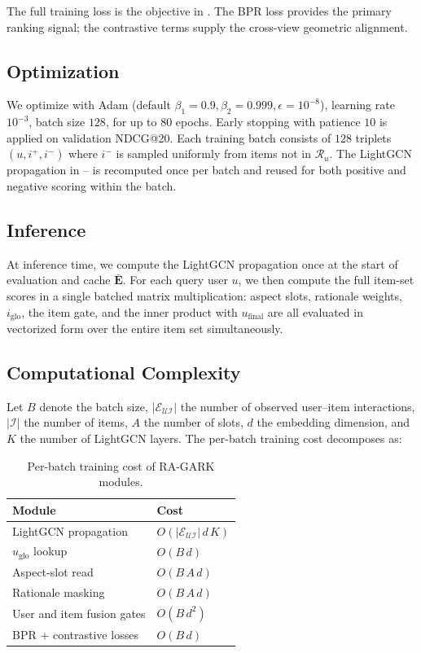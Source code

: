 The full training loss is the objective in . The BPR loss provides the primary ranking signal; the contrastive terms supply the cross-view geometric alignment.

\subsection{Optimization}
\label{sec:train-opt}

We optimize  with Adam (default $\beta_1 = 0.9, \beta_2 = 0.999, \epsilon = 10^{-8}$), learning rate $10^{-3}$, batch size $128$, for up to $80$ epochs. Early stopping with patience $10$ is applied on validation NDCG@20. Each training batch consists of $128$ triplets $(u, i^+, i^-)$ where $i^-$ is sampled uniformly from items not in $\mathcal{R}_u$. The LightGCN propagation in -- is recomputed once per batch and reused for both positive and negative scoring within the batch.

\subsection{Inference}
\label{sec:train-inference}

At inference time, we compute the LightGCN propagation once at the start of evaluation and cache $\bar{\mathbf{E}}$. For each query user $u$, we then compute the full item-set scores in a single batched matrix multiplication: aspect slots, rationale weights, $i_{\mathrm{glo}}$, the item gate, and the inner product with $u_{\mathrm{final}}$ are all evaluated in vectorized form over the entire item set simultaneously.

\subsection{Computational Complexity}
\label{sec:train-complexity}

Let $B$ denote the batch size, $|\mathcal{E}_{\mathcal{U}\mathcal{I}}|$ the number of observed user--item interactions, $|\mathcal{I}|$ the number of items, $A$ the number of slots, $d$ the embedding dimension, and $K$ the number of LightGCN layers. The per-batch training cost decomposes as:

\begin{table}[!htbp]
\centering
\caption{Per-batch training cost of RA-GARK modules.}
\label{tab:complexity}
\begin{tabular}{ll}
\toprule
Module & Cost \\
\midrule
LightGCN propagation       & $O(|\mathcal{E}_{\mathcal{U}\mathcal{I}}|\, d\, K)$ \\
$u_{\mathrm{glo}}$ lookup  & $O(B\, d)$ \\
Aspect-slot read           & $O(B\, A\, d)$ \\
Rationale masking          & $O(B\, A\, d)$ \\
User and item fusion gates & $O(B\, d^2)$ \\
BPR + contrastive losses   & $O(B\, d)$ \\
\bottomrule
\end{tabular}
\end{table}
\FloatBarrier

